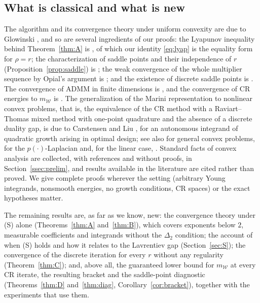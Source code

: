 \documentclass[11pt]{amsart}
\theoremstyle{definition}
\theoremstyle{remark}
\numberwithin{equation}{section}
\newcommand{\mW}{m_{\mathcal W}}
\begin{document}
\subsection*{What is classical and what is new}
The algorithm and its convergence theory under uniform convexity are due to Glowinski \cite[Ch.~VI]{Glowinski1984ChVI}, and so are several ingredients of our proofs: the Lyapunov inequality behind Theorem~\ref{thm:A} is \cite[Ch.~VI, (5.25)]{Glowinski1984ChVI}, of which our identity \eqref{eq:lyap} is the equality form for $\rho=r$; the characterization of saddle points and their independence of $r$ (Proposition~\ref{prop:saddle}) is \cite[Ch.~VI, Thm.~2.1]{Glowinski1984ChVI}; the weak convergence of the whole multiplier sequence by Opial's argument is \cite[Ch.~VI, \S7]{Glowinski1984ChVI}; and the existence of discrete saddle points is \cite[Ch.~VI, \S4.2]{Glowinski1984ChVI}. The convergence of ADMM in finite dimensions is \cite[Thm.~8]{EcksteinBertsekas1992}, and the convergence of CR energies to $\mW$ is \cite[Thm.~1]{BalciOrtnerStorn2022}. The generalization of the Marini representation to nonlinear convex problems, that is, the equivalence of the CR method with a Raviart--Thomas mixed method with one-point quadrature and the absence of a discrete duality gap, is due to Carstensen and Liu \cite[Thm.~3.1]{CarstensenLiu2015}, for an autonomous integrand of quadratic growth arising in optimal design; see also \cite{Bartels2021} for general convex problems, \cite[Prop.~2.37]{BalciKaltenbach2023} for the $p(\cdot)$-Laplacian and, for the linear case, \cite{Marini1985,ArnoldBrezzi1985}. %
Standard facts of convex analysis are collected, with references and without proofs, in Section~\ref{ssec:prelim}, and results available in the literature are cited rather than proved. We give complete proofs wherever the setting (arbitrary Young integrands, nonsmooth energies, no growth conditions, CR spaces) or the exact hypotheses matter.

The remaining results are, as far as we know, new: the convergence theory under (S) alone (Theorems~\ref{thm:A} and~\ref{thm:B}), which covers exponents below $2$, measurable coefficients and integrands without the $\Delta_2$ condition; the account of when (S) holds and how it relates to the Lavrentiev gap (Section~\ref{sec:S}); the convergence of the discrete iteration for every $r$ without any regularity (Theorem~\ref{thm:C}); and, above all, the guaranteed lower bound for $\mW$ at every CR iterate, the resulting bracket and the saddle-point diagnostic (Theorems~\ref{thm:D} and~\ref{thm:diag}, Corollary~\ref{cor:bracket}), together with the experiments that use them.
\end{document}
